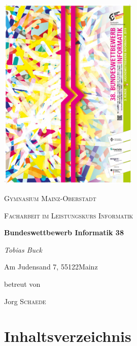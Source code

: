 \documentclass[a4paper,12pt,arial]{scrartcl}
\newcommand{\Name}{Tobias Buck}
\newcommand{\Strasse}{Am Judensand 7}
\newcommand{\Ort}{Mainz}
\newcommand{\PLZ}{55122}
\newcommand{\Schule}{Gymnasium Mainz-Oberstadt}
\newcommand{\Leistungskurs}{Informatik}
\newcommand{\Betreuer}{Jorg \textsc{Schaede}}
\newcommand{\Thema}{Bundeswettbewerb Informatik 38}
\begin{document}
\begin{titlepage}
	\centering
	\includegraphics[width=0.5\textwidth]{BWinf38_image.pdf}
	\\
    \textit{\textcite{bwinfPlakat}}
	\par\vspace{1cm}
	
	{\scshape\LARGE \Schule \par}
	\vspace{1cm}
	{\scshape\Large Facharbeit im Leistungskurs \Leistungskurs\par}
	\vspace{1.5cm}
	{\huge\bfseries \Thema\par}
	\vspace{2cm}
	{\Large\itshape \Name\par}
	\small{\Strasse, \PLZ \space \Ort}
	\vfill
\par
	betreut von\par
	\Betreuer

\end{titlepage}

\begin{abstract}
Diese Arbeit handelt von der Bearbeitung des Bundeswettbewerbs-Informatik 38. Dabei werden Graphentheorie, Algorithmen und Datenstrukturen zur Losung komplexer Probleme genutzt. In der ersten Aufgabe wird ein Computer-Programm entwickelt, welche das Brettspiel Stromrallye löst. Bei der 2. Aufgabe geht es darum in einem Straßennetz, den Weg zu finden der sehr schnell ist, aber auch wenige Abbiegungen beinhaltet.
\end{abstract}
\section{Inhaltsverzeichnis}
\tableofcontents
\end{document}
